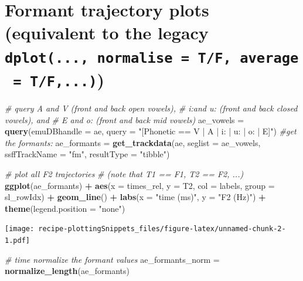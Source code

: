 \documentclass[]{book}
\newenvironment{Shaded}{\begin{snugshade}}{\end{snugshade}}
\newcommand{\CommentTok}[1]{\textcolor[rgb]{0.56,0.35,0.01}{\textit{#1}}}
\newcommand{\DataTypeTok}[1]{\textcolor[rgb]{0.13,0.29,0.53}{#1}}
\newcommand{\KeywordTok}[1]{\textcolor[rgb]{0.13,0.29,0.53}{\textbf{#1}}}
\newcommand{\NormalTok}[1]{#1}
\newcommand{\OperatorTok}[1]{\textcolor[rgb]{0.81,0.36,0.00}{\textbf{#1}}}
\newcommand{\StringTok}[1]{\textcolor[rgb]{0.31,0.60,0.02}{#1}}
\begin{document}
\hypertarget{formant-trajectory-plots-equivalent-to-the-legacy-dplot...-normalise-tf-average-tf...}{%
\section{\texorpdfstring{Formant trajectory plots (equivalent to the legacy \texttt{dplot(...,\ normalise\ =\ T/F,\ average\ =\ T/F,...)})}{Formant trajectory plots (equivalent to the legacy dplot(..., normalise = T/F, average = T/F,...))}}\label{formant-trajectory-plots-equivalent-to-the-legacy-dplot...-normalise-tf-average-tf...}}

\begin{Shaded}
\begin{Highlighting}[]
\CommentTok{# query A and V (front and back open vowels),}
\CommentTok{# i:and u: (front and back closed vowels), and}
\CommentTok{# E and o: (front and back mid vowels)}
\NormalTok{ae_vowels =}\StringTok{ }\KeywordTok{query}\NormalTok{(}\DataTypeTok{emuDBhandle =}\NormalTok{ ae,}
                  \DataTypeTok{query =} \StringTok{"[Phonetic == V | A | i: | u: | o: | E]"}\NormalTok{)}
\CommentTok{#get the formants:}
\NormalTok{ae_formants =}\StringTok{ }\KeywordTok{get_trackdata}\NormalTok{(ae, }
                            \DataTypeTok{seglist =}\NormalTok{ ae_vowels,}
                            \DataTypeTok{ssffTrackName =} \StringTok{"fm"}\NormalTok{,}
                            \DataTypeTok{resultType =} \StringTok{"tibble"}\NormalTok{)}

\CommentTok{# plot all F2 trajectories}
\CommentTok{# (note that T1 == F1, T2 == F2, ...)}
\KeywordTok{ggplot}\NormalTok{(ae_formants) }\OperatorTok{+}
\StringTok{  }\KeywordTok{aes}\NormalTok{(}\DataTypeTok{x =}\NormalTok{ times_rel, }\DataTypeTok{y =}\NormalTok{ T2, }\DataTypeTok{col =}\NormalTok{ labels, }\DataTypeTok{group =}\NormalTok{ sl_rowIdx) }\OperatorTok{+}
\StringTok{  }\KeywordTok{geom_line}\NormalTok{() }\OperatorTok{+}
\StringTok{  }\KeywordTok{labs}\NormalTok{(}\DataTypeTok{x =} \StringTok{"time (ms)"}\NormalTok{, }\DataTypeTok{y =} \StringTok{"F2 (Hz)"}\NormalTok{) }\OperatorTok{+}
\StringTok{  }\KeywordTok{theme}\NormalTok{(}\DataTypeTok{legend.position =} \StringTok{"none"}\NormalTok{)}
\end{Highlighting}
\end{Shaded}

\texttt{[image: recipe-plottingSnippets\_files/figure-latex/unnamed-chunk-2-1.pdf]}

\begin{Shaded}
\begin{Highlighting}[]
\CommentTok{# time normalize the formant values}
\NormalTok{ae_formants_norm =}\StringTok{ }\KeywordTok{normalize_length}\NormalTok{(ae_formants)}
\end{Highlighting}
\end{Shaded}
\end{document}
